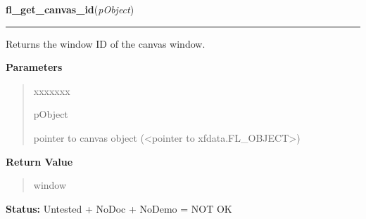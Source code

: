\hspace{.8\funcindent}\begin{boxedminipage}{\funcwidth}

    \raggedright \textbf{fl\_get\_canvas\_id}(\textit{pObject})

    \vspace{-1.5ex}

    \rule{\textwidth}{0.5\fboxrule}
\setlength{\parskip}{2ex}
    Returns the window ID of the canvas window.

\setlength{\parskip}{1ex}
      \textbf{Parameters}
      \vspace{-1ex}

      \begin{quote}
        \begin{Ventry}{xxxxxxx}

          \item[pObject]

          pointer to canvas object ({\textless}pointer to 
          xfdata.FL\_OBJECT{\textgreater})

        \end{Ventry}

      \end{quote}

      \textbf{Return Value}
    \vspace{-1ex}

      \begin{quote}
      window

      \end{quote}

\textbf{Status:} Untested + NoDoc + NoDemo = NOT OK



    \end{boxedminipage}

    \label{xformslib:library:fl_get_canvas_colormap}

    \vspace{0.5ex}


